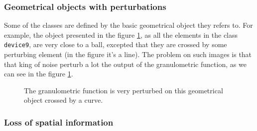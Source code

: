 \subsubsection{Geometrical objects with perturbations}

Some of the classes are defined by the basic geometrical object they refers to. For example, the object presented in the figure \ref{device9-6}, as all the elements in the class \texttt{device9}, are very close to a ball, excepted that they are crossed by some perturbing element (in the figure it's a line). The problem on such images is that that king of noise perturb a lot the output of the granulometric function, as we can see in the figure \ref{device9-6}.

\begin{figure}[!ht]
    \centering
    \qquad\qquad\qquad
    \caption{The granulometric function is very perturbed on this geometrical object crossed by a curve.}
	\label{device9-6}
\end{figure}

\subsubsection{Loss of spatial information}

